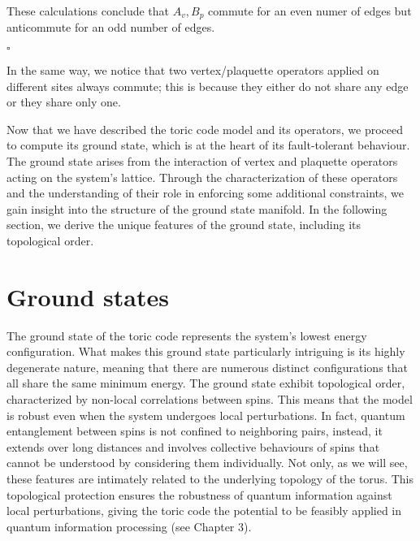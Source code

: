 \documentclass{Configuration_Files/PoliMi3i_thesis}
\begin{document}
These calculations conclude that $A_{v},B_{p}$ commute for an even numer of edges but anticommute for an odd number of edges.

\hfill $\square$

In the same way, we notice that two vertex/plaquette operators applied on different sites always commute; this is because they either do not share any edge or they share only one.\newline

Now that we have described the toric code model and its operators, we proceed to compute its ground state, which is at the heart of its fault-tolerant behaviour. The ground state arises from the interaction of vertex and plaquette operators acting on the system's lattice. Through the characterization of these operators and the understanding of their role in enforcing some additional constraints, we gain insight into the structure of the ground state manifold. \newline
In the following section, we derive the unique features of the ground state, including its topological order. \newline 




















\newpage
\section{Ground states}
\label{sec:GS}

The ground state of the toric code represents the system's lowest energy configuration. What makes this ground state particularly intriguing is its highly degenerate nature, meaning that there are numerous distinct configurations that all share the same minimum energy. 
The ground state exhibit topological order, characterized by non-local correlations between spins. This means that the model is robust  even when the system undergoes local perturbations.  In fact, quantum entanglement between spins is not confined to neighboring pairs, instead, it extends over long distances and involves collective behaviours of spins that cannot be understood by considering them individually.
Not only, as we will see, these features are intimately related to the underlying topology of the torus. This topological protection ensures the robustness of quantum information against local perturbations, giving the toric code the potential to be feasibly applied in quantum information processing (see Chapter 3).\newline
\end{document}
